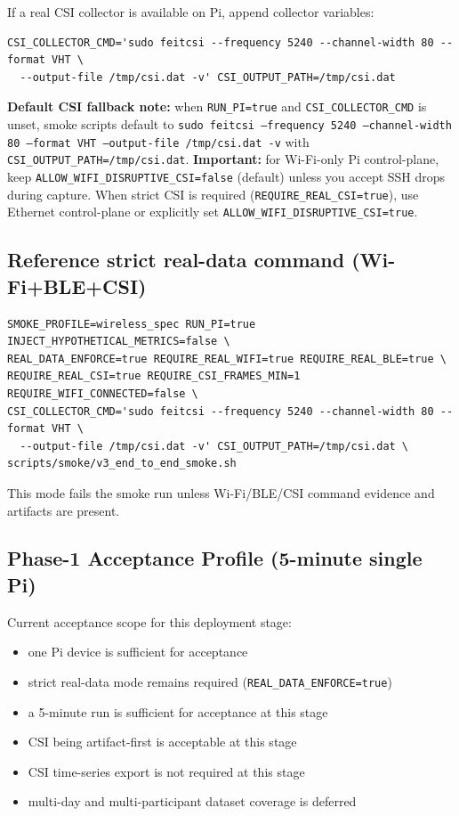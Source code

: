 \documentclass[11pt,a4paper]{article}
\begin{document}
If a real CSI collector is available on Pi, append collector variables:
\begin{verbatim}
CSI_COLLECTOR_CMD='sudo feitcsi --frequency 5240 --channel-width 80 --format VHT \
  --output-file /tmp/csi.dat -v' CSI_OUTPUT_PATH=/tmp/csi.dat
\end{verbatim}
\textbf{Default CSI fallback note:} when \texttt{RUN\_PI=true} and \texttt{CSI\_COLLECTOR\_CMD} is unset, smoke scripts default to
\texttt{sudo feitcsi --frequency 5240 --channel-width 80 --format VHT --output-file /tmp/csi.dat -v} with
\texttt{CSI\_OUTPUT\_PATH=/tmp/csi.dat}.
\textbf{Important:} for Wi-Fi-only Pi control-plane, keep \texttt{ALLOW\_WIFI\_DISRUPTIVE\_CSI=false} (default) unless you accept SSH drops during capture.
When strict CSI is required (\texttt{REQUIRE\_REAL\_CSI=true}), use Ethernet control-plane or explicitly set \texttt{ALLOW\_WIFI\_DISRUPTIVE\_CSI=true}.

\subsection{Reference strict real-data command (Wi-Fi+BLE+CSI)}
\begin{verbatim}
SMOKE_PROFILE=wireless_spec RUN_PI=true INJECT_HYPOTHETICAL_METRICS=false \
REAL_DATA_ENFORCE=true REQUIRE_REAL_WIFI=true REQUIRE_REAL_BLE=true \
REQUIRE_REAL_CSI=true REQUIRE_CSI_FRAMES_MIN=1 REQUIRE_WIFI_CONNECTED=false \
CSI_COLLECTOR_CMD='sudo feitcsi --frequency 5240 --channel-width 80 --format VHT \
  --output-file /tmp/csi.dat -v' CSI_OUTPUT_PATH=/tmp/csi.dat \
scripts/smoke/v3_end_to_end_smoke.sh
\end{verbatim}
This mode fails the smoke run unless Wi-Fi/BLE/CSI command evidence and artifacts are present.

\subsection{Phase-1 Acceptance Profile (5-minute single Pi)}
Current acceptance scope for this deployment stage:
\begin{itemize}
  \item one Pi device is sufficient for acceptance
  \item strict real-data mode remains required (\texttt{REAL\_DATA\_ENFORCE=true})
  \item a 5-minute run is sufficient for acceptance at this stage
  \item CSI being artifact-first is acceptable at this stage
  \item CSI time-series export is not required at this stage
  \item multi-day and multi-participant dataset coverage is deferred
\end{itemize}
\end{document}
